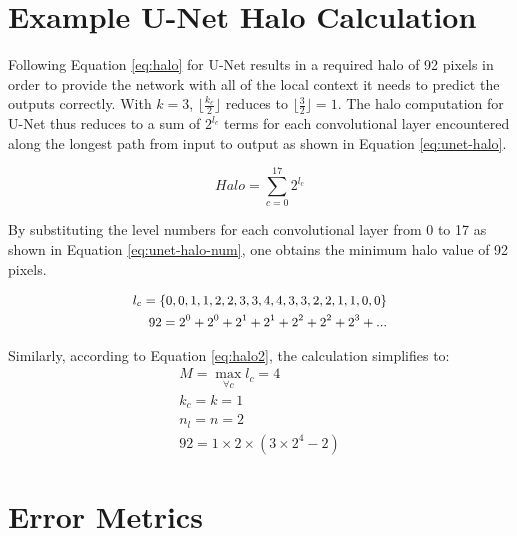 \documentclass[10pt, indentfirst]{article}
\begin{document}
\section{Example U-Net Halo Calculation}

Following Equation \ref{eq:halo} for U-Net results in a required halo of 92 pixels in order to provide the network with all of the local context it needs to predict the outputs correctly. With $k = 3$, $\lfloor \frac{k_c}{2} \rfloor$ reduces to $\lfloor \frac{3}{2} \rfloor = 1$. The halo computation for U-Net thus reduces to a sum of $2^{l_c}$ terms for each convolutional layer encountered along the longest path from input to output as shown in Equation \ref{eq:unet-halo}. 

\begin{equation}
Halo = \sum_{c=0}^{17} 2^{l_c}
\label{eq:unet-halo}
\end{equation}

By substituting the level numbers for each convolutional layer from 0 to 17 as shown in Equation \ref{eq:unet-halo-num}, one obtains the minimum halo value of 92 pixels. 

\begin{equation}
\begin{small}
\begin{aligned} 
l_c = \{0, 0, 1, 1, 2, 2, 3, 3, 4, 4, 3, 3, 2, 2, 1, 1, 0, 0\} \\
92 = 2^0 + 2^0 + 2^1 + 2^1 + 2^2 + 2^2 + 2^3 + ...
\end{aligned}
\end{small}
\label{eq:unet-halo-num}
\end{equation}

Similarly, according to Equation \ref{eq:halo2}, the calculation simplifies to:
\begin{equation}
\begin{aligned} 
M=\max_{\forall c} { l_c } = 4\\
k_c = k = 1  \\
n_l = n = 2 \\
92 = 1 \times 2 \times (3 \times 2^4 - 2)
\end{aligned}
\label{eq:unet-halo-num2}
\end{equation}


\section{Error Metrics}
\end{document}
